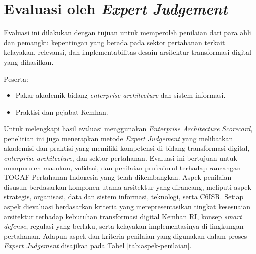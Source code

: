 \section{Evaluasi oleh \textit{Expert Judgement}}
Evaluasi ini dilakukan dengan tujuan untuk memperoleh penilaian dari para ahli dan pemangku kepentingan yang berada pada sektor pertahanan terkait kelayakan, relevansi, dan implementabilitas desain arsitektur transformasi digital yang dihasilkan.

Peserta:
\begin{itemize}
  \item Pakar akademik bidang \textit{enterprise architecture} dan sistem informasi.
  \item Praktisi dan pejabat Kemhan.
\end{itemize}

Untuk melengkapi hasil evaluasi menggunakan \textit{Enterprise Architecture Scorecard}\texttrademark{}, penelitian ini juga menerapkan metode \textit{Expert Judgement} yang melibatkan akademisi dan praktisi yang memiliki kompetensi di bidang transformasi digital, \textit{enterprise architecture}, dan sektor pertahanan.
Evaluasi ini bertujuan untuk memperoleh masukan, validasi, dan penilaian profesional terhadap rancangan TOGAF Pertahanan Indonesia yang telah dikembangkan.
Aspek penilaian disusun berdasarkan komponen utama arsitektur yang dirancang, meliputi aspek strategis, organisasi, data dan sistem informasi, teknologi, serta C6ISR.
Setiap aspek dievaluasi berdasarkan kriteria yang merepresentasikan tingkat kesesuaian arsitektur terhadap kebutuhan transformasi digital Kemhan RI, konsep \textit{smart defense}, regulasi yang berlaku, serta kelayakan implementasinya di lingkungan pertahanan.
Adapun aspek dan kriteria penilaian yang digunakan dalam proses \textit{Expert Judgement} disajikan pada Tabel \ref{tab:aspek-penilaian}.

